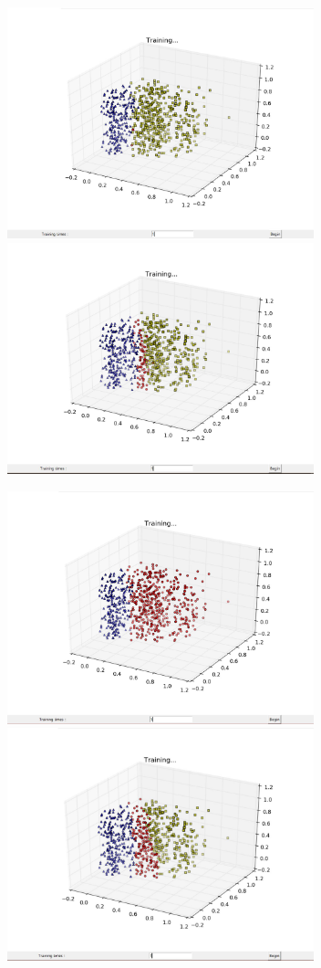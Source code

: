 \documentclass[12pt]{article}
\begin{document}
\includegraphics[width=3.5in]{05.jpg}
\includegraphics[width=3.5in]{06.jpg}

\includegraphics[width=3.5in]{07.jpg}
\includegraphics[width=3.5in]{08.jpg}
\end{document}
